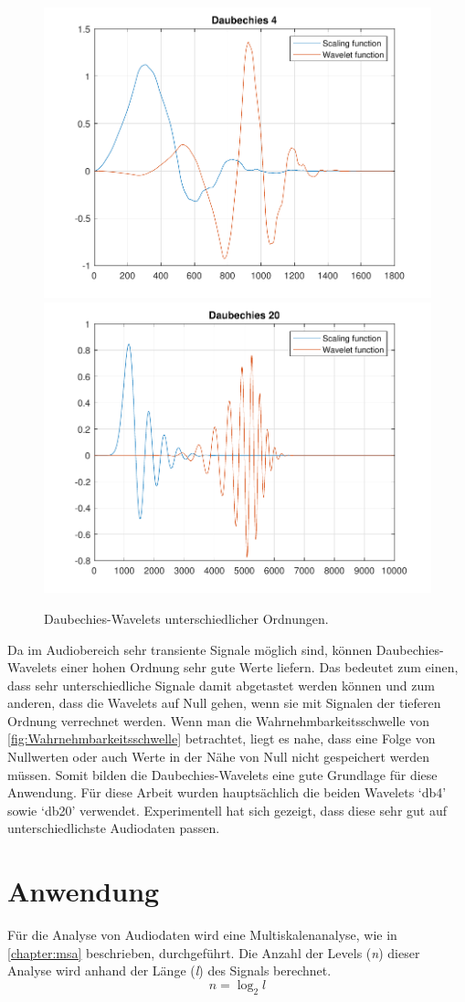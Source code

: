 \begin{refsection}
\begin{figure}[h]
	\includegraphics[width=0.5\linewidth]{papers/compress/Bilder/db4}
	\includegraphics[width=0.5\linewidth]{papers/compress/Bilder/db20}
	\label{fig:dbN}
	\caption{Daubechies-Wavelets unterschiedlicher Ordnungen.}
\end{figure}

Da im Audiobereich sehr transiente Signale möglich sind, können Daubechies-Wavelets einer hohen Ordnung sehr gute Werte liefern.
Das bedeutet zum einen, dass sehr unterschiedliche Signale damit abgetastet werden können und zum anderen, dass die Wavelets auf Null gehen, wenn sie mit Signalen der tieferen Ordnung verrechnet werden.
Wenn man die Wahrnehmbarkeitsschwelle von \autoref{fig:Wahrnehmbarkeitsschwelle} betrachtet, liegt es nahe, dass eine Folge von Nullwerten oder auch Werte in der Nähe von Null nicht gespeichert werden müssen.
Somit bilden die Daubechies-Wavelets eine gute Grundlage für diese Anwendung.
Für diese Arbeit wurden hauptsächlich die beiden Wavelets `db4' sowie `db20' verwendet.
Experimentell hat sich gezeigt, dass diese sehr gut auf unterschiedlichste Audiodaten passen.

\section{Anwendung}
Für die Analyse von Audiodaten wird eine Multiskalenanalyse, wie in \autoref{chapter:msa} beschrieben, durchgeführt.
Die Anzahl der Levels (\textit{n}) dieser Analyse wird anhand der Länge (\textit{l}) des Signals berechnet. 
\begin{equation}
\textit{n} = \log_2{\textit{l}}
\end{equation}


\end{refsection}
